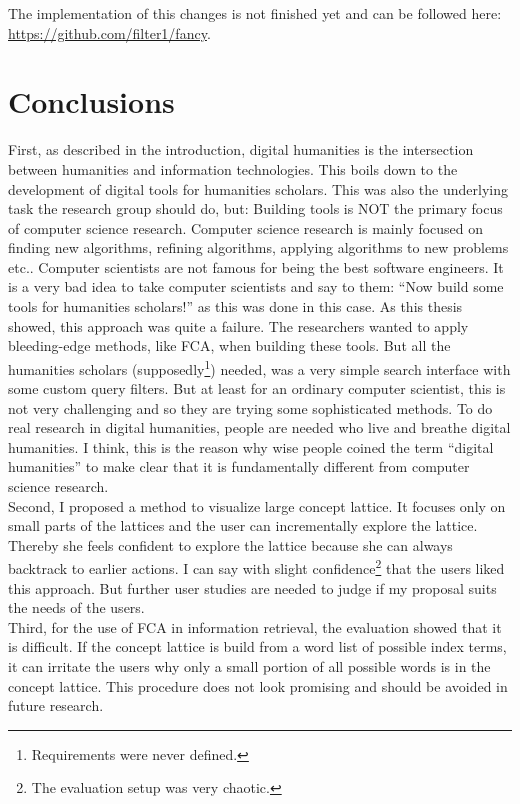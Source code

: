 \documentclass[11pt]{report}
\begin{document}
The implementation of this changes is not finished yet and can be followed here: \url{https://github.com/filter1/fancy}.

\chapter{Conclusions}
\label{Conclusions}

First, as described in the introduction, digital humanities is the intersection between humanities and information technologies. This boils down to the development of digital tools for humanities scholars. This was also the underlying task the research group should do, but: Building tools is NOT the primary focus of computer science research. Computer science research is mainly focused on finding new algorithms, refining algorithms, applying algorithms to new problems etc.. Computer scientists are not famous for being the best software engineers. It is a very bad idea to take computer scientists and say to them: ``Now build some tools for humanities scholars!'' as this was done in this case. As this thesis showed, this approach was quite a failure. The researchers wanted to apply bleeding-edge methods, like FCA, when building these tools. But all the humanities scholars (supposedly\footnote{Requirements were never defined.}) needed, was a very simple search interface with some custom query filters. But at least for an ordinary computer scientist, this is not very challenging and so they are trying some sophisticated methods. To do real research in digital humanities, people are needed who live and breathe digital humanities. I think, this is the reason why wise people coined the term ``digital humanities'' to make clear that it is fundamentally different from computer science research. \\

Second, I proposed a method to visualize large concept lattice. It focuses only on small parts of the lattices and the user can incrementally explore the lattice. Thereby she feels confident to explore the lattice because she can always backtrack to earlier actions. I can say with slight confidence\footnote{The evaluation setup was very chaotic.} that the users liked this approach. But further user studies are needed to judge if my proposal suits the needs of the users. \\

Third, for the use of FCA in information retrieval, the evaluation showed that it is difficult. If the concept lattice is build from a word list of possible index terms, it can irritate the users why only a small portion of all possible words is in the concept lattice. This procedure does not look promising and should be avoided in future research.
\newpage


\end{document}

